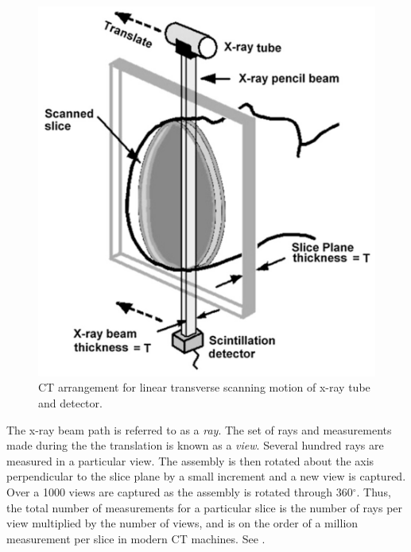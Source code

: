 \begin{figure}[ht]
\centering
		\includegraphics[scale=0.3]{media/0-imaging/ct1.png}
%
\caption{CT arrangement for linear transverse scanning motion of x-ray tube and detector. ~\cite{goldman_2007}}
\label{fig:ct1}
\end{figure}

The x-ray beam path is referred to as a \textit{ray}. The set of rays and measurements made during the the translation is known as a \textit{view}. Several hundred rays are measured in a particular view. The assembly is then rotated about the axis perpendicular to the slice plane by a small increment and a new view is captured. Over a 1000 views are captured as the assembly is rotated through 360$^{\circ}$. Thus, the total number of measurements for a particular slice is the number of rays per view multiplied by the number of views, and is on the order of a million measurement per slice in modern CT machines. See .

